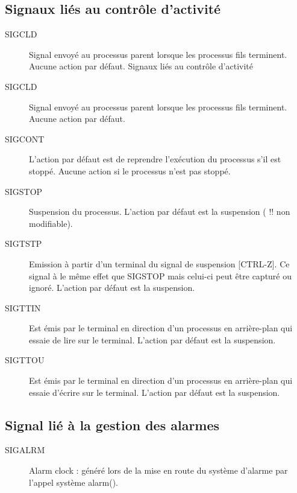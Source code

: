 \documentclass[10pt,french,A4]{article}
\theoremstyle{plain}
\begin{document}
\subsection{Signaux liés au contrôle d'activité}
\begin{description}
   \item[SIGCLD] Signal envoyé au processus parent lorsque les processus fils terminent.
Aucune action par défaut.
Signaux liés au contrôle d'activité
   \item[SIGCLD] Signal envoyé au processus parent lorsque les processus fils terminent.
Aucune action par défaut.
   \item[SIGCONT] L'action par défaut est de reprendre l'exécution du processus s'il est stoppé.
Aucune action si le processus n'est pas stoppé.
   \item[SIGSTOP] Suspension du processus.
L'action par défaut est la suspension ( !! non modifiable).
   \item[SIGTSTP] Emission à partir d'un terminal du signal de suspension [CTRL-Z]. Ce signal à
le même effet que SIGSTOP mais celui-ci peut être capturé ou ignoré.
L'action par défaut est la suspension.
   \item[SIGTTIN] Est émis par le terminal en direction d'un processus en arrière-plan qui essaie
de lire sur le terminal. L'action par défaut est la suspension.
   \item[SIGTTOU] Est émis par le terminal en direction d'un processus en arrière-plan qui essaie
d'écrire sur le terminal. L'action par défaut est la suspension.
\end{description}

\subsection{Signal lié à la gestion des alarmes}
\begin{description}
       \item[SIGALRM]
    Alarm clock : généré lors de la mise en route du système d'alarme par l'appel
    système alarm().
\end{description}
\end{document}
